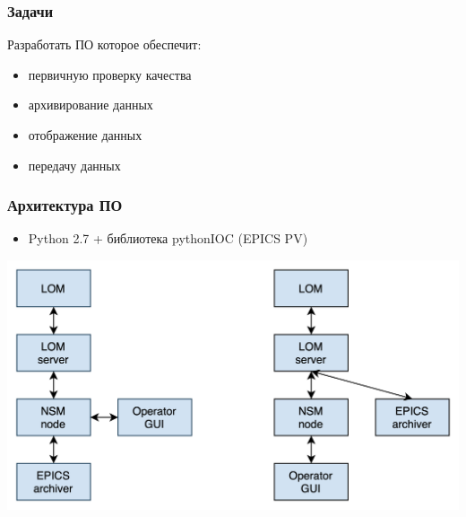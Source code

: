 \documentclass{beamer}
\begin{document}
\begin{frame}
\frametitle{Задачи}
    Разработать ПО которое обеспечит:
    \begin{itemize}
        \item первичную проверку качества
        \item архивирование данных
        \item отображение данных
        \item передачу данных
    \end{itemize}
\end{frame}

\begin{frame}
\frametitle{Архитектура ПО}
    \begin{itemize}
        \item Python 2.7 + библиотека pythonIOC (EPICS PV)
    \end{itemize}
\includegraphics[width=\textwidth]{Architecture.png}
\end{frame}
\end{document}
